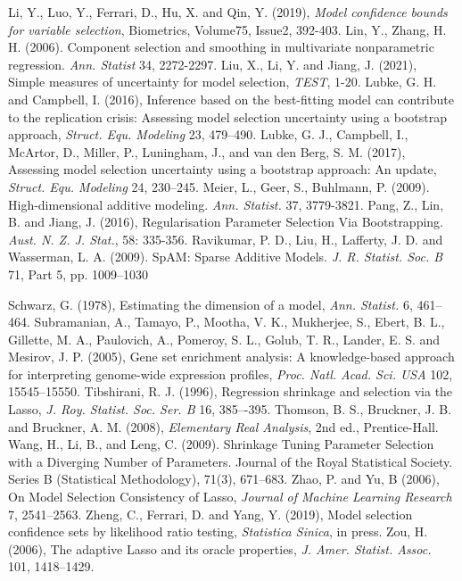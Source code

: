 \documentclass[12pt]{article} %
\theoremstyle{definition}
\begin{document}
\begin{thebibliography}{}
Li, Y., Luo, Y.,  Ferrari, D.,  Hu, X.  and Qin, Y. (2019), {\it Model confidence bounds for variable selection}, Biometrics, Volume75, Issue2, 392-403.
Lin, Y., Zhang, H. H. (2006). Component selection and smoothing in multivariate nonparametric
regression. {\it Ann. Statist} 34, 2272-2297.
Liu, X., Li, Y. and Jiang, J. (2021), Simple measures of uncertainty for model selection, {\it TEST}, 1-20.
Lubke,  G. H. and Campbell, I. (2016),  Inference based on the best-fitting
model can contribute to the replication crisis: Assessing model selection
uncertainty using a bootstrap approach, {\it Struct. Equ. Modeling} 23,
479--490.
Lubke, G. J., Campbell, I., McArtor, D., Miller, P., Luningham, J., and
van den Berg, S. M. (2017), Assessing model selection uncertainty using a bootstrap approach: An update, {\it Struct. Equ. Modeling} 24, 230--245.
Meier, L., Geer, S., Buhlmann, P. (2009). High-dimensional additive modeling. {\it Ann. Statist.} 37, 3779-3821.
Pang, Z., Lin, B. and Jiang, J. (2016), Regularisation Parameter Selection Via Bootstrapping. {\it Aust. N. Z. J. Stat.}, 58: 335-356. 
Ravikumar, P. D., Liu, H., Lafferty, J. D. and Wasserman, L. A. (2009). SpAM: Sparse Additive Models. {\it  J. R. Statist. Soc. B} 71, Part 5, pp. 1009–1030

Schwarz, G. (1978), Estimating the dimension of a model, {\it Ann. Statist.} 6, 461--464.
Subramanian, A., Tamayo, P., Mootha, V. K., Mukherjee, S., Ebert, B. L., Gillette, M. A., Paulovich, A., Pomeroy, S. L., Golub, T. R., Lander, E. S. and Mesirov, J. P. (2005), Gene set enrichment analysis: A knowledge-based approach for interpreting genome-wide expression profiles, {\it Proc. Natl. Acad. Sci. USA} 102, 15545--15550.
Tibshirani, R. J. (1996), Regression shrinkage and selection via the Lasso, {\it J. Roy. Statist. Soc. Ser. B} 16, 385–-395.
Thomson, B. S., Bruckner, J. B. and Bruckner, A. M. (2008), {\it Elementary Real Analysis}, 2nd ed., Prentice-Hall.
Wang, H., Li, B., and Leng, C. (2009). Shrinkage Tuning Parameter Selection with a Diverging Number of Parameters. Journal of the Royal Statistical Society. Series B (Statistical Methodology), 71(3), 671–683. 
Zhao, P. and Yu, B (2006),  On Model Selection Consistency of Lasso, {\it Journal of Machine Learning Research} 7, 2541--2563.
Zheng, C., Ferrari, D. and Yang, Y. (2019), Model selection confidence sets
by likelihood ratio testing, {\it Statistica Sinica}, in press.
Zou, H. (2006), The adaptive Lasso and its oracle properties, {\it J. Amer. Statist. Assoc.} 101, 1418--1429.



\end{thebibliography}
\end{document}
